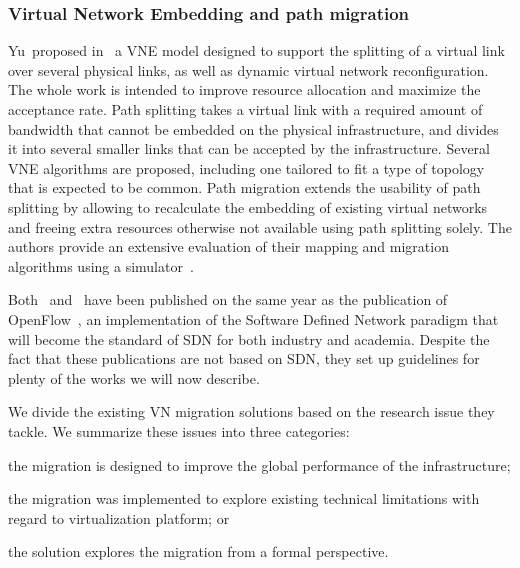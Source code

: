 \subsubsection{Virtual Network Embedding and path migration}
Yu~\etal proposed in~\cite{VNE-Yu2008} a VNE model designed to support the splitting of a virtual link over several physical links, as well as dynamic virtual network reconfiguration.
The whole work is intended to improve resource allocation and maximize the acceptance rate. 
Path splitting takes a virtual link with a required amount of bandwidth that cannot be embedded on the physical infrastructure, and divides it into several smaller links that can be accepted by the infrastructure.
Several VNE algorithms are proposed, including one tailored to fit a type of topology that is expected to be common.
Path migration extends the usability of path splitting by allowing to recalculate the embedding of existing virtual networks and freeing extra resources otherwise not available using path splitting solely.
The authors provide an extensive evaluation of their mapping and migration algorithms using a simulator~\cite{vnesimulator}.

Both~\cite{VROOM-Wang2008} and~\cite{VNE-Yu2008} have been published on the same year as the publication of OpenFlow~\cite{Openflow-McKeown2008}, an implementation of the Software Defined Network paradigm that will become the standard of SDN for both industry and academia.
Despite the fact that these publications are not based on SDN, they set up guidelines for plenty of the works we will now describe.

We divide the existing VN migration solutions based on the research issue they tackle.
We summarize these issues into three categories: 
\begin{inparaenum}[i)] 
\item the migration is designed to improve the global performance of the infrastructure;
\item the migration was implemented to explore existing technical limitations with regard to virtualization platform; or 
\item the solution explores the migration from a formal perspective.
\end{inparaenum}


